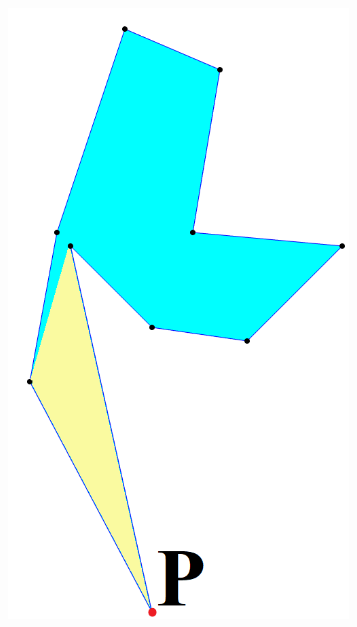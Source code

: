 \documentclass[conference]{IEEEtran}
\begin{document}
			\begin{figure}[htbp]
				\centering
				\begin{subfigure}{0.32\linewidth}
					\centering
					\includegraphics[width=0.99\textwidth]{fig2a.png}
					\caption{}
					\label{fig2a}
				\end{subfigure}
				\begin{subfigure}{0.32\linewidth}
					\centering

\end{subfigure}
\end{figure}
\end{document}
